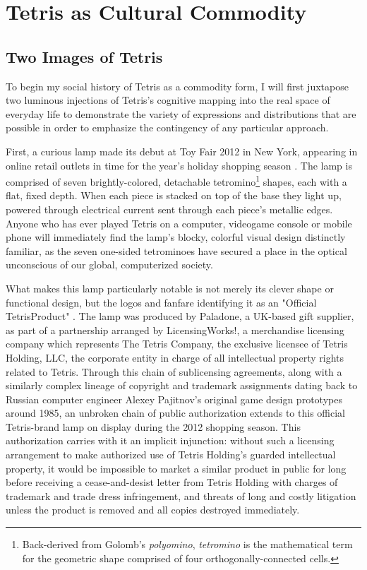 \section{Tetris as Cultural Commodity}
\subsection*{Two Images of Tetris}
To begin my social history of Tetris as a commodity form, I will first juxtapose two luminous injections of Tetris's cognitive mapping into the real space of everyday life to demonstrate the variety of expressions and distributions that are possible in order to emphasize the contingency of any particular approach.

First, a curious lamp made its debut at Toy Fair 2012 in New York, appearing in online retail outlets in time for the year's holiday shopping season \autocite{Tetris2012-toy}. The lamp is comprised of seven brightly-colored, detachable tetromino\footnote{
  Back-derived from Golomb's \emph{polyomino}, \emph{tetromino} is the mathematical term for the geometric shape comprised of four orthogonally-connected cells.
}
shapes, each with a flat, fixed depth. When each piece is stacked on top of the base they light up, powered through electrical current sent through each piece's metallic edges. Anyone who has ever played Tetris on a computer, videogame console or mobile phone will immediately find the lamp's blocky, colorful visual design distinctly familiar, as the seven one-sided tetrominoes have secured a place in the optical unconscious of our global, computerized society.

What makes this lamp particularly notable is not merely its clever shape or functional design, but the logos and fanfare identifying it as an "Official Tetris\texttrademark\space Product" \autocite{Tetris2012-lamp}. The lamp was produced by Paladone, a UK-based gift supplier, as part of a partnership arranged by LicensingWorks!, a merchandise licensing company which represents The Tetris Company, the exclusive licensee of Tetris Holding, LLC, the corporate entity in charge of all intellectual property rights related to Tetris. Through this chain of sublicensing agreements, along with a similarly complex lineage of copyright and trademark assignments dating back to Russian computer engineer Alexey Pajitnov's original game design prototypes around 1985, an unbroken chain of public authorization extends to this official Tetris-brand lamp on display during the 2012 shopping season. This authorization carries with it an implicit injunction: without such a licensing arrangement to make authorized use of Tetris Holding's guarded intellectual property, it would be impossible to market a similar product in public for long before receiving a cease-and-desist letter from Tetris Holding with charges of trademark and trade dress infringement, and threats of long and costly litigation unless the product is removed and all copies destroyed immediately.

